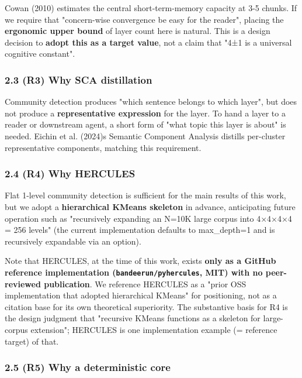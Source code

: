 \documentclass[
]{article}
\begin{document}
Cowan (2010) estimates the central short-term-memory capacity at 3-5
chunks. If we require that "concern-wise convergence be easy for the
reader", placing the \textbf{ergonomic upper bound} of layer count here
is natural. This is a design decision to \textbf{adopt this as a target
value}, not a claim that "4±1 is a universal cognitive constant".

\subsubsection{2.3 (R3) Why SCA
distillation}\label{23-r3-why-sca-distillation}

Community detection produces "which sentence belongs to which layer",
but does not produce a \textbf{representative expression} for the layer.
To hand a layer to a reader or downstream agent, a short form of "what
topic this layer is about" is needed. Eichin et al.
(2024)\textquotesingle s Semantic Component Analysis distills
per-cluster representative components, matching this requirement.

\subsubsection{2.4 (R4) Why HERCULES}\label{24-r4-why-hercules}

Flat 1-level community detection is sufficient for the main results of
this work, but we adopt a \textbf{hierarchical KMeans skeleton} in
advance, anticipating future operation such as "recursively expanding an
N=10K large corpus into 4×4×4×4 = 256 levels" (the current
implementation defaults to max\_depth=1 and is recursively expandable
via an option).

Note that HERCULES, at the time of this work, exists \textbf{only as a
GitHub reference implementation (\texttt{bandeerun/pyhercules}, MIT)
with no peer-reviewed publication}. We reference HERCULES as a "prior
OSS implementation that adopted hierarchical KMeans" for positioning,
not as a citation base for its own theoretical superiority. The
substantive basis for R4 is the design judgment that "recursive KMeans
functions as a skeleton for large-corpus extension"; HERCULES is one
implementation example (= reference target) of that.

\subsubsection{2.5 (R5) Why a deterministic
core}\label{25-r5-why-a-deterministic-core}
\end{document}
